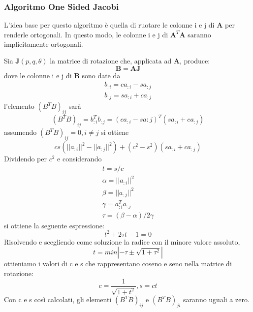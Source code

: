 \subsubsection{Algoritmo One Sided Jacobi}
L'idea base per questo algoritmo è quella di ruotare le colonne i e j di $\mathbf{A}$ per renderle ortogonali. In questo modo, le colonne i e j di $\mathbf{A}^T\mathbf{A}$ saranno implicitamente ortogonali.

Sia $\mathbf{J}(p,q,\theta)$ la matrice di rotazione che, applicata ad $\mathbf{A}$, produce:
\begin{equation}
\mathbf{B}=\mathbf{AJ}
\end{equation}
dove le colonne i e j di $\mathbf{B}$ sono date da
\begin{eqnarray}
b_{:i}=ca_{:i}-sa_{:j}\\
b_{:j}=sa_{:i}+ca_{:j}
\end{eqnarray}
l'elemento $(B^TB)_{ij}$ sarà
\[
(B^TB)_{ij}=b_{:i}^Tb_{:j}=(ca_{:i}-sa{:j})^T(sa_{:i}+ca_{:j})
\]
assumendo $(B^TB)_{ij}=0,i\neq j$ si ottiene
\[
cs(||a_{:i}||^2-||a_{:j}||^2)+(c^2-s^2)(sa_{:i}+ca_{:j})
\]
Dividendo per $c^2$ e considerando
\begin{equation*}
\begin{aligned}
t=s/c\\
\alpha = ||a_{:i}||^2\\
\beta = ||a_{:j}||^2\\
\gamma = a_{:i}^Ta_{:j}\\
\tau =(\beta - \alpha)/2\gamma
\end{aligned}
\end{equation*}
si ottiene la seguente espressione:
\begin{equation}
t^2+2\tau t-1=0
\end{equation}
Risolvendo e scegliendo come soluzione la radice con il minore valore assoluto,
\begin{equation}
t=min|-\tau\pm\sqrt{1+\tau^2}|
\end{equation}
ottieniamo i valori di c e s che rappresentano coseno e seno nella matrice di rotazione:
\begin{equation}
c=\frac{1}{\sqrt{1+t^2}}, s=ct
\end{equation}
Con c e s così calcolati, gli elementi $(B^TB)_{ij}$ e $(B^TB)_{ji}$ saranno uguali a zero.



